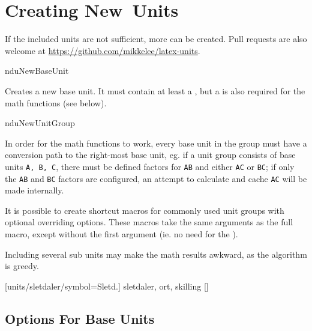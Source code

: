 \documentclass[
	a4paper,
]{article}
\begin{document}
\clearpage
\section{Creating New Units} %

\label{sec:units:new}
If the included units are not sufficient, more can be created. Pull requests are also welcome at \url{https://github.com/mikkelee/latex-units}.

\begin{docCommand}
	{nduNewBaseUnit}
	{}
	
Creates a new base unit. It must contain at least a , but a  is also required for the math functions (see below).

\end{docCommand}

\begin{docCommand}
	{nduNewUnitGroup}
	{}

	In order for the math functions to work, every base unit in the group must have a conversion path to the right-most base unit, eg. if a unit group consists of base units \texttt{A, B, C}, there must be defined factors for \texttt{A\rightarrow B} and either \texttt{A\rightarrow C} or \texttt{B\rightarrow C}; if only the \texttt{A\rightarrow B} and \texttt{B\rightarrow C} factors are configured, an attempt to calculate and cache \texttt{A\rightarrow C} will be made internally.

	It is possible to create shortcut macros for commonly used unit groups with optional overriding options. These macros take the same arguments as the full  macro, except without the first argument (ie. no need for the ).
	
	Including several sub units may make the math results awkward, as the algorithm is greedy.

\begin{dispExample}
	[units/sletdaler/symbol={Sletd.}]
	{sletdaler, ort, skilling}
	[\mySldl]
\end{dispExample}

\end{docCommand}

\clearpage
\subsection{Options For Base Units}
\end{document}
